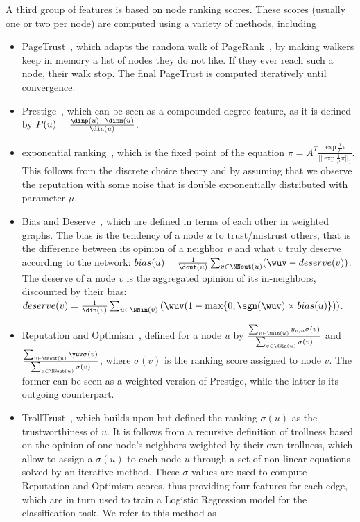 \begin{newcontent}
A third group of features is based on node ranking scores. These scores (usually one or two per
node) are computed using a variety of methods, including
\begin{itemize}
	\item	PageTrust~\autocite{de2008pagetrust}, which adapts the random walk of
		PageRank~\autocite{pagerank99}, by making walkers keep in memory a list of nodes they do not
		like. If they ever reach such a node, their walk stop. The final PageTrust is computed
		iteratively until convergence. 
	\item Prestige~\autocite{zolfaghar2010mining}, which can be seen as a compounded degree feature,
		as it is defined by $P(u) = \frac{\dinp(u)-\dinm(u)}{\din(u)}$.
	\item	exponential ranking~\autocite{traag2010exponential}, which is the fixed point of the
		equation $\pi = A^T\frac{\exp{\frac{1}{\mu}\pi}}{||\exp{\frac{1}{\mu}\pi}||_1}$. This follows
		from the discrete choice theory and by assuming that we observe the reputation with some noise
		that is double exponentially distributed with parameter $\mu$.
	\item	Bias and Deserve~\autocite{mishra2011finding}, which are defined in terms of each other in
		weighted graphs. The bias is the tendency of a node $u$ to trust/mistrust others, that is the
		difference between its opinion of a neighbor $v$ and what $v$ truly deserve according to the
		network: $bias(u) = \frac{1}{\dout(u)}\sum_{v\in\NNout(u)}(\wuv - deserve(v))$. The deserve of a
		node $v$ is the aggregated opinion of its in-neighbors, discounted by their bias: $deserve(v) =
		\frac{1}{\din(v)}\sum_{u\in\NNin(v)}\left(\wuv(1-\max\{0, \sgn(\wuv)\times bias(u)\})\right)$.
	\item	Reputation and Optimism~\autocite{shahriari2014ranking}, defined for a node $u$ by
		$\frac{\sum_{v \in \NNin(u)} y_{v,u}\sigma(v)}{\sum_{v \in \NNin(u)} \sigma(v)}$ and $
		\frac{\sum_{v \in \NNout(u)} \yuv\sigma(v)}{\sum_{v \in \NNout(u)} \sigma(v)}$, where
		$\sigma(v)$ is the ranking score assigned to node $v$. The former can be seen as a weighted
		version of Prestige, while the latter is its outgoing counterpart.
	\item	TrollTrust~\autocite{wu2016troll}, which builds upon \autocite{shahriari2014ranking} but
		defined the ranking $\sigma(u)$ as the trustworthiness of $u$. It is follows from a recursive
		definition of trollness based on the opinion of one node's neighbors weighted by their own
		trollness, which allow to assign a $\sigma(u)$ to each node $u$ through a set of non linear
		equations solved by an iterative method. These $\sigma$ values are used to compute Reputation
		and Optimism scores, thus providing four features for each edge, which are in turn used to train
		a Logistic Regression model for the classification task. We refer to this method as
		\emph{\compranknodes{}}.
\end{itemize}


\end{newcontent}
